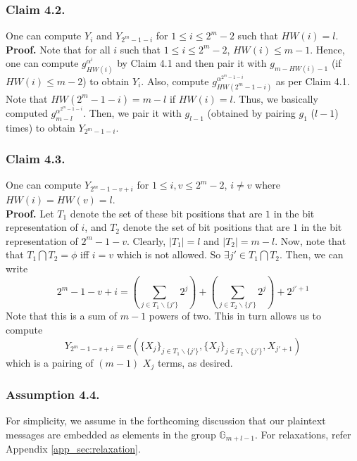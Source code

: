 \subsubsection{Claim 4.2.} One can compute $Y_{i}$ and $Y_{2^m-1-i}$ for $1\leq i\leq 2^m-2$ such that $HW(i)=l$.\\

\noindent\textbf{Proof.} Note that for all $i$ such that $1\leq i\leq 2^m-2$, $HW(i)\leq m-1$. Hence, one can compute $g^{\alpha^i}_{HW(i)}$ by Claim 4.1 and then pair it with $g_{m-HW(i)-1}$ (if $HW(i)\leq m-2$) to obtain $Y_{i}$.  Also, compute $g^{\alpha^{2^m-1-i}}_{HW(2^m-1-i)}$ as per Claim 4.1. Note that $HW(2^m-1-i)=m-l$ if $HW(i)=l$. Thus, we basically computed $g^{\alpha^{2^m-1-i}}_{m-l}$. Then, we pair it with $g_{l-1}$ (obtained by pairing $g_1$ ($l-1$) times) to obtain $Y_{2^m-1-i}$. 

\subsubsection{Claim 4.3.}  One can compute $Y_{2^m-1-v+i}$ for $1\leq i,v\leq 2^m-2$, $i\neq v$ where $HW(i)=HW(v)=l$.\\

\noindent\textbf{Proof.} Let $T_1$ denote the set of these bit positions that are $1$ in the bit representation of $i$, and $T_2$ denote the set of bit positions that are $1$ in the bit representation of $2^m-1-v$. Clearly, $|T_1|=l$ and $|T_2|=m-l$. Now, note that that $T_1\bigcap T_2=\phi$ iff $i=v$ which is not allowed. So $\exists j'\in T_1\bigcap T_2$. Then, we can write
\begin{equation}
{2^m-1-v+i}=\left(\sum_{j\in T_1\backslash\{j'\}}2^j\right) + \left(\sum_{j\in T_2\backslash\{j'\}}2^j\right) + 2^{j'+1}\nonumber
\end{equation}
\noindent Note that this is a sum of $m-1$ powers of two. This in turn allows us to compute
\begin{equation}
 Y_{2^m-1-v+i}=e\left(\{X_j\}_{j\in T_1\backslash\{j'\}},\{X_j\}_{j\in T_2\backslash\{j'\}},X_{j'+1}\right)\nonumber
\end{equation}
which is a pairing of $(m-1)$ $X_j$ terms, as desired.

\subsubsection{Assumption 4.4.} For simplicity, we assume in the forthcoming discussion that our plaintext messages are embedded as elements in the group $\mathbb{G}_{m+l-1}$. For relaxations, refer Appendix \ref{app_sec:relaxation}.

